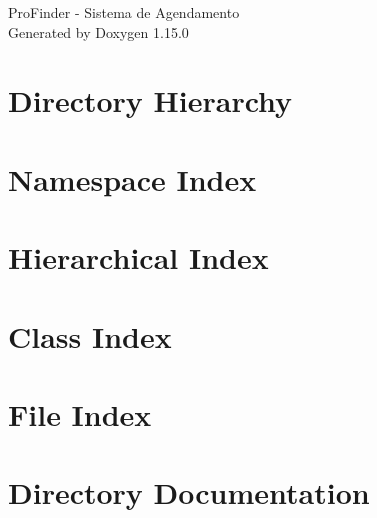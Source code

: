 \documentclass[twoside]{book}
\newcommand{\+}{\discretionary{\mbox{\scriptsize$\hookleftarrow$}}{}{}}
\newcommand{\clearemptydoublepage}{%
    \newpage{\pagestyle{empty}\cleardoublepage}%
  }
\begin{document}
  \raggedbottom
    \hypersetup{pageanchor=false,
                bookmarksnumbered=true,
                pdfencoding=unicode
               }
  \begin{titlepage}
  \vspace*{7cm}
  \begin{center}%
  {\Large Pro\+Finder -\/ Sistema de Agendamento}\\
  \vspace*{1cm}
  {\large Generated by Doxygen 1.15.0}\\
  \end{center}
  \end{titlepage}
  \clearemptydoublepage
  \tableofcontents
  \clearemptydoublepage
  \hypersetup{pageanchor=true}
\chapter{Directory Hierarchy}

\chapter{Namespace Index}

\chapter{Hierarchical Index}

\chapter{Class Index}

\chapter{File Index}

\chapter{Directory Documentation}













\end{document}
